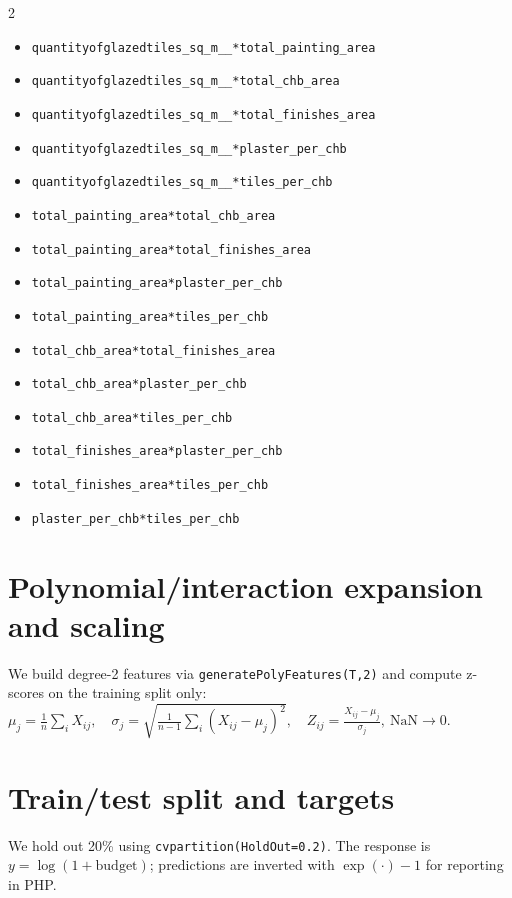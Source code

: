 \documentclass[11pt]{article}
\begin{document}
\begin{multicols}{2}
\begin{itemize}[leftmargin=*]
  \item \verb|quantityofglazedtiles_sq_m__*total_painting_area|\item \verb|quantityofglazedtiles_sq_m__*total_chb_area|\item \verb|quantityofglazedtiles_sq_m__*total_finishes_area|\item \verb|quantityofglazedtiles_sq_m__*plaster_per_chb|\item \verb|quantityofglazedtiles_sq_m__*tiles_per_chb|
  \item \verb|total_painting_area*total_chb_area|\item \verb|total_painting_area*total_finishes_area|\item \verb|total_painting_area*plaster_per_chb|\item \verb|total_painting_area*tiles_per_chb|
  \item \verb|total_chb_area*total_finishes_area|\item \verb|total_chb_area*plaster_per_chb|\item \verb|total_chb_area*tiles_per_chb|
  \item \verb|total_finishes_area*plaster_per_chb|\item \verb|total_finishes_area*tiles_per_chb|
  \item \verb|plaster_per_chb*tiles_per_chb|
\end{itemize}
\end{multicols}
\normalsize

\section*{Polynomial/interaction expansion and scaling}
We build degree-2 features via \verb|generatePolyFeatures(T,2)| and compute z-scores on the training split only:
\(
\mu_j = \frac{1}{n}\sum_i X_{ij},\quad \sigma_j = \sqrt{\tfrac{1}{n-1}\sum_i (X_{ij}-\mu_j)^2},\quad Z_{ij}=\frac{X_{ij}-\mu_j}{\sigma_j},\ \text{NaN}\to 0.
\)

\section*{Train/test split and targets}
We hold out 20\% using \verb|cvpartition(HoldOut=0.2)|. The response is $y=\log(1+\text{budget})$; predictions are inverted with $\exp(\cdot)-1$ for reporting in PHP.
\end{document}
